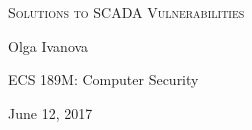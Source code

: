 \begin{titlepage}
    \begin{center}
        \vspace*{3cm}
        \textsc{\Large Solutions to SCADA Vulnerabilities}
        \vspace{11cm}
        
        {\large Olga Ivanova
        \smallskip
        
        ECS 189M: Computer Security
        \smallskip
        
        June 12, 2017}
    
    \end{center}
\end{titlepage}